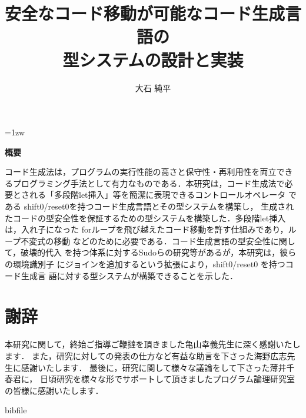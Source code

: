 \documentclass[a4paper,11pt]{jreport}
\title{安全なコード移動が可能なコード生成言語の\\型システムの設計と実装}
\author{大石 純平}
\begin{document}
\maketitle
\thispagestyle{empty}
\newpage

\thispagestyle{empty}
\vspace*{20pt plus 1fil}
\parindent=1zw
\noindent
\begin{center}
  {\bf 概要}
  \vspace{5mm}
\end{center}
コード生成法は，プログラムの実行性能の高さと保守性・再利用性を両立でき
るプログラミング手法として有力なものである．本研究は，コード生成法で必
要とされる「多段階let挿入」等を簡潔に表現できるコントロールオペレータ
である shift0/reset0を持つコード生成言語とその型システムを構築し，
生成されたコードの型安全性を保証するための型システムを構築した．多段階let挿入は，入れ子になった
forループを飛び越えたコード移動を許す仕組みであり，ループ不変式の移動
などのために必要である．コード生成言語の型安全性に関して，破壊的代入
を持つ体系に対するSudoらの研究等があるが，本研究は，彼らの環境識別子
にジョインを追加するという拡張により，shift0/reset0 を持つコード生成言
語に対する型システムが構築できることを示した．

\par
\vspace{0pt plus 1fil}
\newpage

\tableofcontents
\listoffigures

\pagebreak \setcounter{page}{1}







% 
% 


\chapter*{謝辞}
本研究に関して，終始ご指導ご鞭撻を頂きました亀山幸義先生に深く感謝いたします．
また，研究に対しての発表の仕方など有益な助言を下さった海野広志先生に感謝いたします．
最後に，研究に関して様々な議論をして下さった薄井千春君に，
日頃研究を様々な形でサポートして頂きましたプログラム論理研究室の皆様に感謝いたします．
\newpage

\renewcommand{\bibname}{参考文献}

\nocite{*}
 {bibfile}

% 
\end{document}
